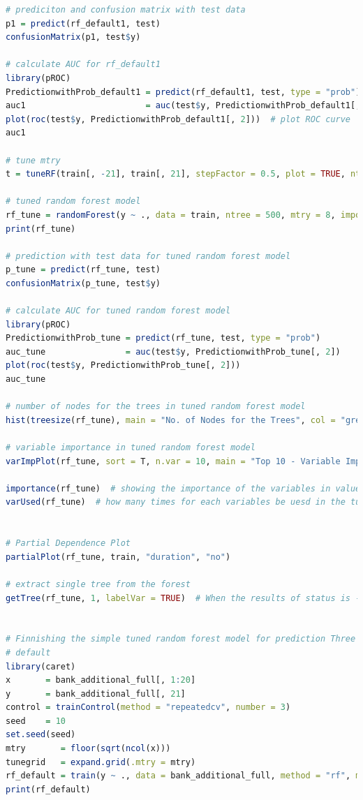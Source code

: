 \documentclass[12pt, a4paper, bibliography=totoc, english]{scrartcl}
\begin{document}
\begin{lstlisting}[language = R]
# prediciton and confusion matrix with test data
p1 = predict(rf_default1, test)
confusionMatrix(p1, test$y)

# calculate AUC for rf_default1
library(pROC)
PredictionwithProb_default1 = predict(rf_default1, test, type = "prob")
auc1                        = auc(test$y, PredictionwithProb_default1[, 2])
plot(roc(test$y, PredictionwithProb_default1[, 2]))  # plot ROC curve
auc1

# tune mtry
t = tuneRF(train[, -21], train[, 21], stepFactor = 0.5, plot = TRUE, ntreeTry = 500, trace = TRUE, improve = 0.05)  # From the result, we can choose the reasonable value of mtry.

# tuned random forest model
rf_tune = randomForest(y ~ ., data = train, ntree = 500, mtry = 8, importance = TRUE, proximity = TRUE)
print(rf_tune)

# prediction with test data for tuned random forest model
p_tune = predict(rf_tune, test)
confusionMatrix(p_tune, test$y)

# calculate AUC for tuned random forest model
library(pROC)
PredictionwithProb_tune = predict(rf_tune, test, type = "prob")
auc_tune                = auc(test$y, PredictionwithProb_tune[, 2])
plot(roc(test$y, PredictionwithProb_tune[, 2]))
auc_tune

# number of nodes for the trees in tuned random forest model
hist(treesize(rf_tune), main = "No. of Nodes for the Trees", col = "green")

# variable importance in tuned random forest model
varImpPlot(rf_tune, sort = T, n.var = 10, main = "Top 10 - Variable Importance")  # showing the importance of the variables in plot

importance(rf_tune)  # showing the importance of the variables in values
varUsed(rf_tune)  # how many times for each variables be uesd in the tuned random forest model


# Partial Dependence Plot
partialPlot(rf_tune, train, "duration", "no")

# extract single tree from the forest
getTree(rf_tune, 1, labelVar = TRUE)  # When the results of status is -1, it means that its the terminal node


# Finnishing the simple tuned random forest model for prediction Three Methods for tuning parameter 'mtry' RF
# default
library(caret)
x       = bank_additional_full[, 1:20]
y       = bank_additional_full[, 21]
control = trainControl(method = "repeatedcv", number = 3)
seed    = 10
set.seed(seed)
mtry       = floor(sqrt(ncol(x)))
tunegrid   = expand.grid(.mtry = mtry)
rf_default = train(y ~ ., data = bank_additional_full, method = "rf", metric = "Accuracy", tuneGrid = tunegrid, trControl = control)
print(rf_default)


\end{lstlisting}
\end{document}
